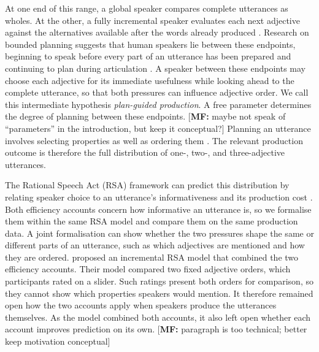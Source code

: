 \documentclass[10pt,a4paper,fleqn]{article}
\newcommand{\mf}[1]{\textcolor{shimmer-main}{[\textbf{MF: }{#1}]}}
\begin{document}
At one end of this range, a global speaker compares complete utterances as wholes.
At the other, a fully incremental speaker evaluates each next adjective against the alternatives available after the words already produced \citep{cohngordon2019incremental,waldon2021modeling}.
Research on bounded planning suggests that human speakers lie between these endpoints, beginning to speak before every part of an utterance has been prepared and continuing to plan during articulation \citep{ferreira2002incremental,konopka2014priming}.
A speaker between these endpoints may choose each adjective for its immediate usefulness while looking ahead to the complete utterance, so that both pressures can influence adjective order.
We call this intermediate hypothesis \emph{plan-guided production}.
A free parameter determines the degree of planning between these endpoints.
\mf{maybe not speak of ``parameters'' in the introduction, but keep it conceptual?}
Planning an utterance involves selecting properties as well as ordering them \citep{fukumura2010use,van2019conceptualization}.
The relevant production outcome is therefore the full distribution of one-, two-, and three-adjective utterances.

\label{sec:bg:incremental}
The Rational Speech Act (RSA) framework can predict this distribution by relating speaker choice to an utterance's informativeness and its production cost \citep{frank2012predicting,goodman2016pragmatic,degen2023rational}.
Both efficiency accounts concern how informative an utterance is, so we formalise them within the same RSA model and compare them on the same production data.
A joint formalisation can show whether the two pressures shape the same or different parts of an utterance, such as which adjectives are mentioned and how they are ordered.
\citet{schlotterbeck2023incremental} proposed an incremental RSA model that combined the two efficiency accounts.
Their model compared two fixed adjective orders, which participants rated on a slider.
Such ratings present both orders for comparison, so they cannot show which properties speakers would mention.
It therefore remained open how the two accounts apply when speakers produce the utterances themselves.
As the model combined both accounts, it also left open whether each account improves prediction on its own.
\mf{paragraph is too technical; better keep motivation conceptual}
\end{document}

